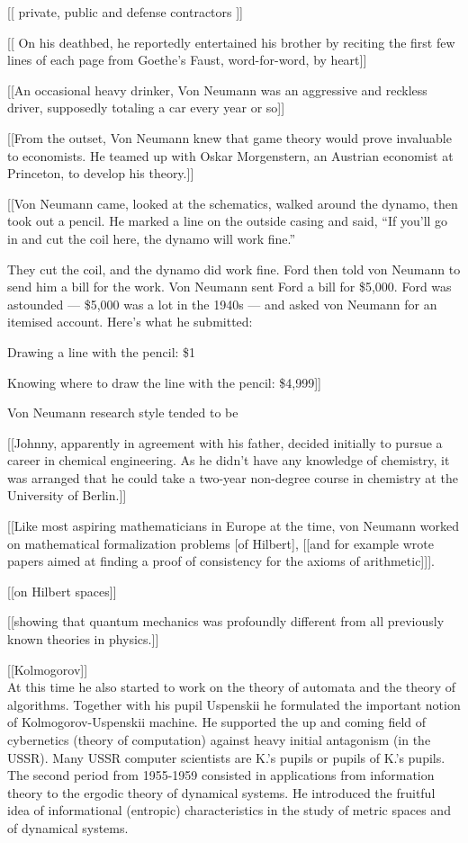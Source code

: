 \documentclass[7pt]{article}
\begin{document}
[[ private, public and defense contractors ]]

[[ On his deathbed, he reportedly entertained his brother by reciting the first few lines of each page from Goethe’s Faust, word-for-word, by heart]]

[[An occasional heavy drinker, Von Neumann was an aggressive and reckless driver, supposedly totaling a car every year or so]]

[[From the outset, Von Neumann knew that game theory would prove invaluable to economists. He teamed up with Oskar Morgenstern, an Austrian economist at Princeton, to develop his theory.]]


[[Von Neumann came, looked at the schematics, walked around the dynamo, then took out a pencil. He marked a line on the outside casing and said, “If you’ll go in and cut the coil here, the dynamo will work fine.”

They cut the coil, and the dynamo did work fine. Ford then told von Neumann to send him a bill for the work. Von Neumann sent Ford a bill for \$5,000. Ford was astounded — \$5,000 was a lot in the 1940s — and asked von Neumann for an itemised account. Here’s what he submitted:

Drawing a line with the pencil: \$1

Knowing where to draw the line with the pencil: \$4,999]]


Von Neumann research style tended to be




[[Johnny, apparently in agreement with his father, decided initially to pursue a career in chemical engineering. As he didn’t have any knowledge of chemistry, it was arranged that he could take a two-year non-degree course in chemistry at the University of Berlin.]]



[[Like most aspiring mathematicians in Europe at the time, von Neumann worked on mathematical formalization problems [of Hilbert], [[and for example wrote papers aimed at finding a proof of consistency for the axioms of arithmetic]]].

[[on Hilbert spaces]]

[[showing that quantum mechanics was profoundly different from all previously known theories in physics.]]

[[Kolmogorov]]\\

At this time he also started to work on the theory of automata and the theory of algorithms. Together with his pupil Uspenskii he formulated the important notion of Kolmogorov-Uspenskii machine. He supported the up and coming field of cybernetics (theory of computation) against heavy initial antagonism (in the USSR). Many USSR computer scientists are K.'s pupils or pupils of K.'s pupils.
The second period from 1955-1959 consisted in applications from information theory to the ergodic theory of dynamical systems. He introduced the fruitful idea of informational (entropic) characteristics in the study of metric spaces and of dynamical systems.
\end{document}
